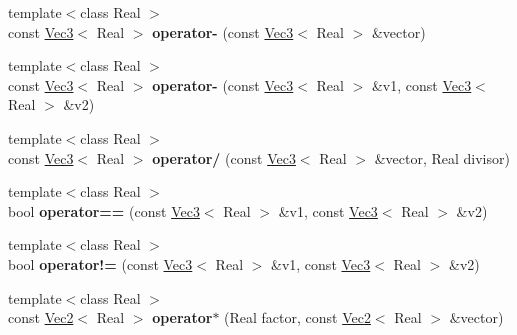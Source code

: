 \begin{DoxyCompactItemize}
\item 
\hypertarget{namespacehokusai_a9c5b7a92ed8dd806851b60f4db743350}{{\footnotesize template$<$class Real $>$ }\\const \hyperlink{classhokusai_1_1Vec3}{Vec3}$<$ Real $>$ {\bfseries operator-\/} (const \hyperlink{classhokusai_1_1Vec3}{Vec3}$<$ Real $>$ \&vector)}\label{namespacehokusai_a9c5b7a92ed8dd806851b60f4db743350}

\item 
\hypertarget{namespacehokusai_a8d3841529c41e634c58d40688a874481}{{\footnotesize template$<$class Real $>$ }\\const \hyperlink{classhokusai_1_1Vec3}{Vec3}$<$ Real $>$ {\bfseries operator-\/} (const \hyperlink{classhokusai_1_1Vec3}{Vec3}$<$ Real $>$ \&v1, const \hyperlink{classhokusai_1_1Vec3}{Vec3}$<$ Real $>$ \&v2)}\label{namespacehokusai_a8d3841529c41e634c58d40688a874481}

\item 
\hypertarget{namespacehokusai_a53f6db7bdddbf961794bb87cdb202122}{{\footnotesize template$<$class Real $>$ }\\const \hyperlink{classhokusai_1_1Vec3}{Vec3}$<$ Real $>$ {\bfseries operator/} (const \hyperlink{classhokusai_1_1Vec3}{Vec3}$<$ Real $>$ \&vector, Real divisor)}\label{namespacehokusai_a53f6db7bdddbf961794bb87cdb202122}

\item 
\hypertarget{namespacehokusai_ab573ff769d367d646ed4f64f9709bddf}{{\footnotesize template$<$class Real $>$ }\\bool {\bfseries operator==} (const \hyperlink{classhokusai_1_1Vec3}{Vec3}$<$ Real $>$ \&v1, const \hyperlink{classhokusai_1_1Vec3}{Vec3}$<$ Real $>$ \&v2)}\label{namespacehokusai_ab573ff769d367d646ed4f64f9709bddf}

\item 
\hypertarget{namespacehokusai_a980a6146ac2e6f1b834e40558a5c46d8}{{\footnotesize template$<$class Real $>$ }\\bool {\bfseries operator!=} (const \hyperlink{classhokusai_1_1Vec3}{Vec3}$<$ Real $>$ \&v1, const \hyperlink{classhokusai_1_1Vec3}{Vec3}$<$ Real $>$ \&v2)}\label{namespacehokusai_a980a6146ac2e6f1b834e40558a5c46d8}

\item 
\hypertarget{namespacehokusai_ad1e4570591258e2a3cdfff0341a4cb7e}{{\footnotesize template$<$class Real $>$ }\\const \hyperlink{classhokusai_1_1Vec2}{Vec2}$<$ Real $>$ {\bfseries operator$\ast$} (Real factor, const \hyperlink{classhokusai_1_1Vec2}{Vec2}$<$ Real $>$ \&vector)}\label{namespacehokusai_ad1e4570591258e2a3cdfff0341a4cb7e}


\end{DoxyCompactItemize}
